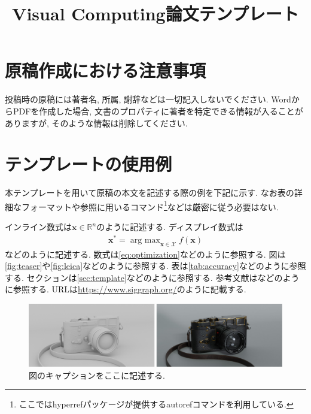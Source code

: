 \documentclass{vc}
\title{Visual Computing論文テンプレート}
\begin{document}
\maketitle


\section{原稿作成における注意事項}

投稿時の原稿には著者名, 所属, 謝辞などは一切記入しないでください.
WordからPDFを作成した場合, 文書のプロパティに著者を特定できる情報が入ることがありますが, そのような情報は削除してください.

\section{テンプレートの使用例}
\label{sec:template}

本テンプレートを用いて原稿の本文を記述する際の例を下記に示す.
なお表の詳細なフォーマットや参照に用いるコマンド\footnote{ここでは\textsf{hyperref}パッケージが提供する\textsf{autoref}コマンド\cite{Wikibooks:LaTeX:Ref}を利用している.}などは厳密に従う必要はない.

インライン数式は$\mathbf{x} \in \mathbb{R}^{n}$のように記述する.
ディスプレイ数式は
\begin{align}
  \mathbf{x}^{*} = \mathop{\text{arg max}}_{\mathbf{x} \in \mathcal{X}} f(\mathbf{x})
  \label{eq:optimization}
\end{align}
などのように記述する.
数式は\autoref{eq:optimization}などのように参照する.
図は\autoref{fig:teaser}や\autoref{fig:leica}などのように参照する.
表は\autoref{tab:accuracy}などのように参照する.
セクションは\autoref{sec:template}などのように参照する.
参考文献は\cite{GSC12,WL00}などのように参照する.
URLは\url{https://www.siggraph.org/}のように記載する.

\begin{figure}
  \centering
  \includegraphics[width=\columnwidth]{./figures/leica.pdf}
  \caption{図のキャプションをここに記述する.}
  \label{fig:leica}
\end{figure}
\end{document}
